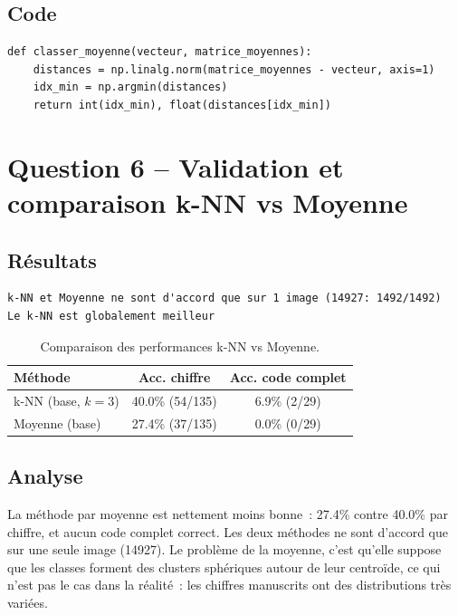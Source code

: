 \documentclass[a4paper,11pt]{article}
\begin{document}
\subsection{Code}

\begin{lstlisting}[style=python, caption={Classifieur par plus proche moyenne.}]
def classer_moyenne(vecteur, matrice_moyennes):
    distances = np.linalg.norm(matrice_moyennes - vecteur, axis=1)
    idx_min = np.argmin(distances)
    return int(idx_min), float(distances[idx_min])
\end{lstlisting}

\section{Question 6 -- Validation et comparaison k-NN vs Moyenne}

\subsection{Résultats}

\begin{lstlisting}[style=output, caption={Comparaison k-NN et Moyenne.}]
k-NN et Moyenne ne sont d'accord que sur 1 image (14927: 1492/1492)
Le k-NN est globalement meilleur
\end{lstlisting}

\begin{table}[H]
\centering
\caption{Comparaison des performances k-NN vs Moyenne.}
\label{tab:comp_knn_moy}
\begin{tabular}{l|c|c}
\toprule
\textbf{Méthode} & \textbf{Acc. chiffre} & \textbf{Acc. code complet} \\
\midrule
k-NN (base, $k=3$) & 40.0\% (54/135) & 6.9\% (2/29) \\
Moyenne (base) & 27.4\% (37/135) & 0.0\% (0/29) \\
\bottomrule
\end{tabular}
\end{table}

\subsection{Analyse}

La méthode par moyenne est nettement moins bonne~: 27.4\% contre 40.0\% par chiffre, et aucun code complet correct. Les deux méthodes ne sont d'accord que sur une seule image (14927). Le problème de la moyenne, c'est qu'elle suppose que les classes forment des clusters sphériques autour de leur centroïde, ce qui n'est pas le cas dans la réalité~: les chiffres manuscrits ont des distributions très variées.
\end{document}
